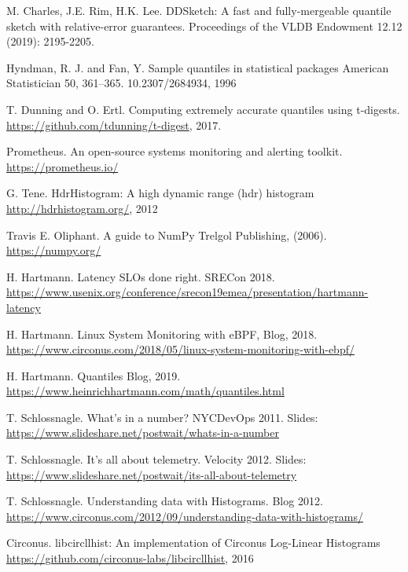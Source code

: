 \documentclass{article}
\theoremstyle{plain}
\theoremstyle{remark}
\begin{document}

\begin{thebibliography}{1}

  M. Charles, J.E. Rim, H.K. Lee.
  \newblock DDSketch: A fast and fully-mergeable quantile sketch with relative-error guarantees.
  \newblock Proceedings of the VLDB Endowment 12.12 (2019): 2195-2205.

  Hyndman, R. J. and Fan, Y.
  \newblock Sample quantiles in statistical packages
  \newblock American Statistician 50, 361–365. 10.2307/2684934, 1996

  T. Dunning and O. Ertl.
  \newblock  Computing extremely accurate quantiles using t-digests.
  \newblock \url{https://github.com/tdunning/t-digest}, 2017.

  Prometheus.
  \newblock An open-source systems monitoring and alerting toolkit.
  \newblock \url{https://prometheus.io/}

  G. Tene.
  \newblock HdrHistogram: A high dynamic range (hdr) histogram
  \newblock \url{http://hdrhistogram.org/}, 2012

  Travis E. Oliphant.
  \newblock A guide to NumPy
  \newblock Trelgol Publishing, (2006). \url{https://numpy.org/}

  H. Hartmann.
  \newblock Latency SLOs done right.
  \newblock SRECon 2018. \url{https://www.usenix.org/conference/srecon19emea/presentation/hartmann-latency}

  H. Hartmann.
  \newblock Linux System Monitoring with eBPF,
  \newblock Blog, 2018. \url{https://www.circonus.com/2018/05/linux-system-monitoring-with-ebpf/}

  H. Hartmann.
  \newblock Quantiles
  \newblock Blog, 2019. \url{https://www.heinrichhartmann.com/math/quantiles.html}

  T. Schlossnagle.
  \newblock What's in a number?
  \newblock NYCDevOps 2011. Slides: \url{https://www.slideshare.net/postwait/whats-in-a-number}

  T. Schlossnagle.
  \newblock It's all about telemetry.
  \newblock Velocity 2012. Slides: \url{https://www.slideshare.net/postwait/its-all-about-telemetry}

  T. Schlossnagle.
  \newblock Understanding data with Histograms.
  \newblock Blog 2012. \url{https://www.circonus.com/2012/09/understanding-data-with-histograms/}

  Circonus.
  \newblock libcircllhist: An implementation of Circonus Log-Linear Histograms
  \newblock \url{https://github.com/circonus-labs/libcircllhist}, 2016

\end{thebibliography}
\end{document}
